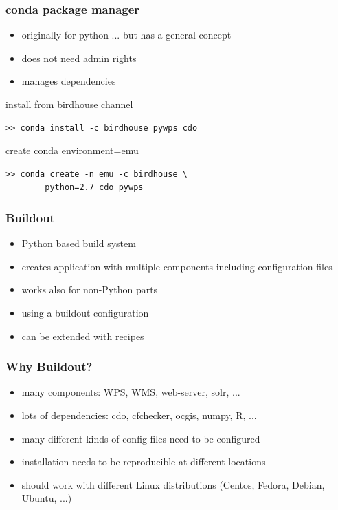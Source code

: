 \documentclass{beamer}
\begin{document}
  \begin{frame}[fragile]
    \frametitle{conda package manager}
    \begin{itemize}
      \item originally for python ... but has a general concept
      \item does not need admin rights
      \item manages dependencies
    \end{itemize}
    \begin{block}{install from birdhouse channel}
      \begin{lstlisting}
>> conda install -c birdhouse pywps cdo 
      \end{lstlisting}
    \end{block}
    \begin{block}{create conda environment=emu}
      \begin{lstlisting}
>> conda create -n emu -c birdhouse \
        python=2.7 cdo pywps 
      \end{lstlisting}
    \end{block}
\end{frame}

  \begin{frame}
    \frametitle{Buildout}
    \begin{itemize}
      \item Python based build system
      \item creates application with multiple components including configuration files
      \item works also for non-Python parts
      \item using a buildout configuration 
      \item can be extended with recipes
    \end{itemize}
  \end{frame}

  \begin{frame}
    \frametitle{Why Buildout?}
    \begin{itemize}
      \item many components: WPS, WMS, web-server, solr, ...
      \item lots of dependencies: cdo, cfchecker, ocgis, numpy, R, ...
      \item many different kinds of config files need to be configured 
      \item installation needs to be reproducible at different locations
      \item should work with different Linux distributions (Centos, Fedora, Debian, Ubuntu, ...)
    \end{itemize}
  \end{frame}
\end{document}
